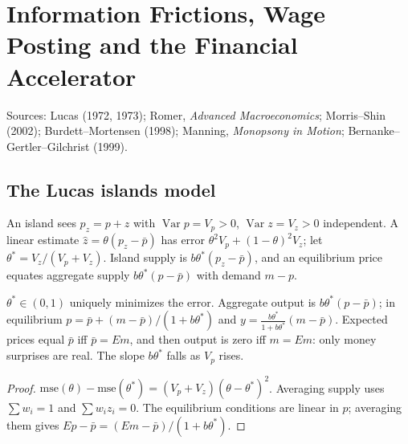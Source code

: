 \chapter{Information Frictions, Wage Posting and the Financial Accelerator}
\label{chap:info_macro}

Sources: Lucas (1972, 1973); Romer, \emph{Advanced Macroeconomics}; Morris--Shin (2002); Burdett--Mortensen (1998);
Manning, \emph{Monopsony in Motion}; Bernanke--Gertler--Gilchrist (1999).

\section{The Lucas islands model}

\begin{definition}
\label{def:lucas_islands}
\leanok
An island sees $p_z = p+z$ with $\operatorname{Var} p = V_p>0$, $\operatorname{Var} z = V_z>0$ independent. A linear estimate
$\hat z = \theta(p_z-\bar p)$ has error $\theta^2V_p+(1-\theta)^2V_z$; let $\theta^*=V_z/(V_p+V_z)$. Island supply is
$b\theta^*(p_z-\bar p)$, and an equilibrium price equates aggregate supply $b\theta^*(p-\bar p)$ with demand $m-p$.
\end{definition}

\begin{theorem}
\label{thm:lucas_islands}
\leanok
{}
$\theta^*\in(0,1)$ uniquely minimizes the error. Aggregate output is $b\theta^*(p-\bar p)$; in equilibrium
$p=\bar p+(m-\bar p)/(1+b\theta^*)$ and $y=\frac{b\theta^*}{1+b\theta^*}(m-\bar p)$. Expected prices equal $\bar p$ iff $\bar p=Em$,
and then output is zero iff $m=Em$: only money surprises are real. The slope $b\theta^*$ falls as $V_p$ rises.
\end{theorem}
\begin{proof}
\leanok
$\mathrm{mse}(\theta)-\mathrm{mse}(\theta^*)=(V_p+V_z)(\theta-\theta^*)^2$. Averaging supply uses $\sum w_i=1$ and $\sum w_iz_i=0$.
The equilibrium conditions are linear in $p$; averaging them gives $Ep-\bar p=(Em-\bar p)/(1+b\theta^*)$.
\end{proof}

